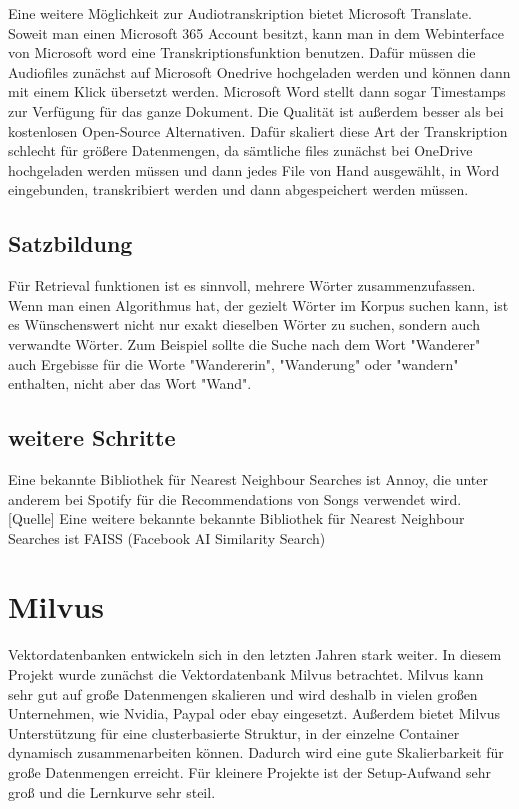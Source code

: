 Eine weitere Möglichkeit zur Audiotranskription bietet Microsoft Translate. 
Soweit man einen Microsoft 365 Account besitzt, kann man in dem Webinterface von Microsoft word eine Transkriptionsfunktion benutzen. 
Dafür müssen die Audiofiles zunächst auf Microsoft Onedrive hochgeladen werden und können dann mit einem Klick übersetzt werden. 
Microsoft Word stellt dann sogar Timestamps  zur Verfügung für das ganze Dokument. 
Die Qualität ist außerdem besser als bei kostenlosen Open-Source Alternativen. 
Dafür skaliert diese Art der Transkription schlecht für größere Datenmengen, da sämtliche files zunächst bei OneDrive hochgeladen werden müssen und dann jedes File von Hand ausgewählt, in Word eingebunden, transkribiert werden und dann abgespeichert werden müssen. 

\subsection{Satzbildung}

Für Retrieval funktionen ist es sinnvoll, mehrere Wörter zusammenzufassen.
Wenn man einen Algorithmus hat, der gezielt Wörter im Korpus suchen kann, ist es Wünschenswert nicht nur exakt dieselben Wörter zu suchen, sondern auch verwandte Wörter.
Zum Beispiel sollte die Suche nach dem Wort "Wanderer" auch Ergebisse für die Worte "Wandererin", "Wanderung" oder "wandern" enthalten, nicht aber das Wort "Wand".


\subsection{weitere Schritte}


Eine bekannte Bibliothek für Nearest Neighbour Searches ist Annoy, die unter anderem bei Spotify für die Recommendations von Songs verwendet wird. [Quelle]
Eine weitere bekannte bekannte Bibliothek für Nearest Neighbour Searches ist FAISS (Facebook AI Similarity Search)

\section{Milvus}

Vektordatenbanken entwickeln sich in den letzten Jahren stark weiter.
In diesem Projekt wurde zunächst die Vektordatenbank Milvus betrachtet.
Milvus kann sehr gut auf große Datenmengen skalieren und wird deshalb in vielen großen Unternehmen, wie Nvidia, Paypal oder ebay eingesetzt. 
Außerdem bietet Milvus Unterstützung für eine clusterbasierte Struktur, in der einzelne Container dynamisch zusammenarbeiten können. 
Dadurch wird eine gute Skalierbarkeit für große Datenmengen erreicht. 
Für kleinere Projekte ist der Setup-Aufwand sehr groß und die Lernkurve sehr steil.

